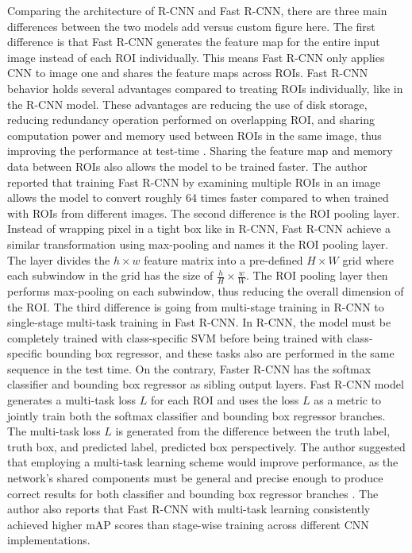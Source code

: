 Comparing the architecture of R-CNN and Fast R-CNN, there are three main differences between the two models {\color{red} add versus custom figure here}. The first difference is that Fast R-CNN generates the feature map for the entire input image instead of each ROI individually. This means Fast R-CNN only applies CNN to image one and shares the feature maps across ROIs. Fast R-CNN behavior holds several advantages compared to treating ROIs individually, like in the R-CNN model. These advantages are reducing the use of disk storage, reducing redundancy operation performed on overlapping ROI, and sharing computation power and memory used between ROIs in the same image, thus improving the performance at test-time \cite{fast_rcnn_og}. Sharing the feature map and memory data between ROIs also allows the model to be trained faster. The author reported that training Fast R-CNN by examining multiple ROIs in an image allows the model to convert roughly 64 times faster compared to when trained with ROIs from different images. The second difference is the ROI pooling layer. Instead of wrapping pixel in a tight box like in R-CNN, Fast R-CNN achieve a similar transformation using max-pooling and names it the ROI pooling layer. The layer divides the $h \times w$ feature matrix into a pre-defined $H \times W$ grid where each subwindow in the grid has the size of $\frac{h}{H} \times \frac{w}{W}$. The ROI pooling layer then performs max-pooling on each subwindow, thus reducing the overall dimension of the ROI. The third difference is going from multi-stage training in R-CNN to single-stage multi-task training in Fast R-CNN. In R-CNN, the model must be completely trained with class-specific SVM before being trained with class-specific bounding box regressor, and these tasks also are performed in the same sequence in the test time. On the contrary, Faster R-CNN has the softmax classifier and bounding box regressor as sibling output layers. Fast R-CNN model generates a multi-task loss $L$ for each ROI and uses the loss $L$ as a metric to jointly train both the softmax classifier and bounding box regressor branches. The multi-task loss $L$ is generated from the difference between the truth label, truth box, and predicted label, predicted box perspectively. The author suggested that employing a multi-task learning scheme would improve performance, as the network's shared components must be general and precise enough to produce correct results for both classifier and bounding box regressor branches \cite{fast_rcnn_og}. The author also reports that Fast R-CNN with multi-task learning consistently achieved higher mAP scores than stage-wise training across different CNN implementations.

